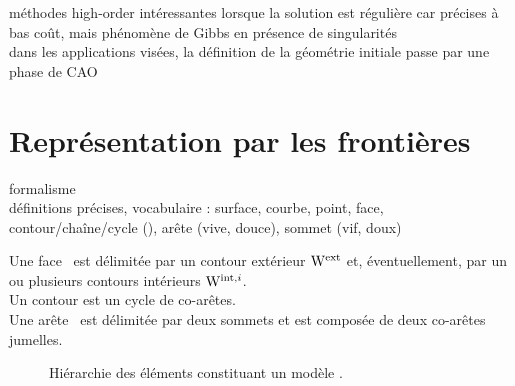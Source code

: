 méthodes high-order intéressantes lorsque la solution est régulière car précises à bas coût, mais phénomène de Gibbs en présence de singularités \cite{bruno2007}\\

dans les applications visées, la définition de la géométrie initiale passe par une phase de CAO


\section{Représentation par les frontières}
formalisme \brep~ \cite[Section 2.2]{pentcheva2010}\\
définitions précises, vocabulaire : surface, courbe, point, face, contour/chaîne/cycle (), arête (vive, douce), sommet (vif, doux)
\par\bigskip
Une face \brepface\ est délimitée par un contour extérieur $\mathrm{W}^{\mathrm{ext}}$ et, éventuellement, par un ou plusieurs contours intérieurs $\mathrm{W}^{\mathrm{int},i}$.\\
Un contour est un cycle de co-arêtes.\\
Une arête \brepedge\ est délimitée par deux sommets et est composée de deux co-arêtes jumelles.\\


\begin{figure}
\centering

\caption{Hiérarchie des éléments constituant un modèle \brep.}
\end{figure}




